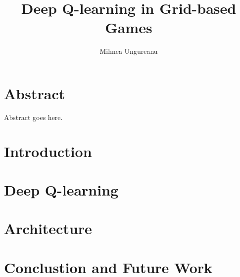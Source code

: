\documentclass[12pt]{report}
\title{
    {Deep Q-learning in Grid-based Games}
}
\author{Mihnea Ungureanu}
\begin{document}
\maketitle

\chapter*{Abstract}
Abstract goes here.

\tableofcontents

\chapter{Introduction}
%

\chapter{Deep Q-learning}
%

\chapter{Architecture}
%

\chapter{Conclustion and Future Work}
%


\end{document}
